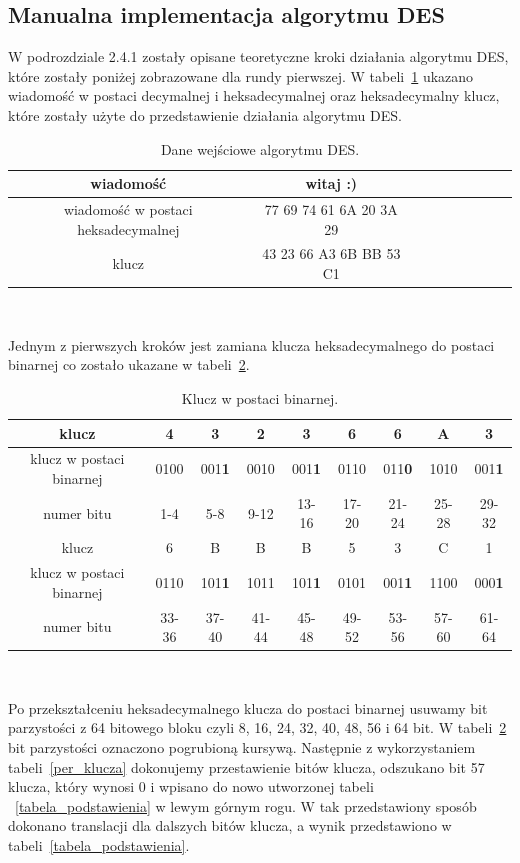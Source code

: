 \documentclass[12p]{article}
\begin{document}
\subsection{Manualna implementacja algorytmu DES}

\quad W podrozdziale 2.4.1 zostały opisane teoretyczne kroki działania algorytmu DES, które zostały poniżej zobrazowane dla rundy pierwszej. W tabeli~\ref{binary} ukazano wiadomość w postaci decymalnej i heksadecymalnej oraz heksadecymalny klucz, które zostały użyte do przedstawienie działania algorytmu DES. 
 
\begin{table}[H]
\centering
\begin{tabular}{|c|c|c|c|c|c|c|c|c|}
\hline
wiadomość & witaj :)\\
\hline
wiadomość w postaci heksadecymalnej & 77 69 74 61 6A 20 3A 29\\
\hline
klucz & 43 23 66 A3 6B BB 53 C1\\
\hline
\end{tabular}
\caption{Dane wejściowe algorytmu DES.}~\label{binary}
\end{table}

Jednym z pierwszych kroków jest zamiana klucza heksadecymalnego do postaci binarnej co zostało ukazane w tabeli~\ref{klucz_to_binary}.


\begin{table}[H]
\centering
\begin{tabular}{|c|c|c|c|c|c|c|c|c|}
\hline
klucz & 4 & 3 & 2 & 3 & 6 & 6 & A & 3\\
\hline
klucz w postaci binarnej & 0100 & 001\textbf{1} & 0010 & 001\textbf{1} & 0110 & 011\textbf{0} & 1010 & 001\textbf{1}\\ 
\hline
numer bitu & 1-4 & 5-8 & 9-12 & 13-16 & 17-20 & 21-24 & 25-28 & 29-32\\
\hline
\hline
klucz & 6 & B & B & B & 5 & 3 & C & 1\\
\hline
klucz w postaci binarnej & 0110 & 101\textbf{1} & 1011 & 101\textbf{1} & 0101 & 001\textbf{1} & 1100 & 000\textbf{1}\\
\hline
numer bitu & 33-36 & 37-40 & 41-44 & 45-48 & 49-52 & 53-56 & 57-60 & 61-64\\
\hline
\end{tabular}
\caption{Klucz w postaci binarnej.}~\label{klucz_to_binary}
\end{table}

Po przekształceniu heksadecymalnego klucza do postaci binarnej usuwamy bit parzystości z 64 bitowego bloku czyli 8, 16, 24, 32, 40, 48, 56 i 64 bit. W tabeli~\ref{klucz_to_binary} bit parzystości oznaczono pogrubioną kursywą. Następnie z wykorzystaniem tabeli~\ref{per_klucza} dokonujemy przestawienie bitów klucza, odszukano bit 57 klucza, który wynosi 0 i wpisano do nowo utworzonej tabeli ~\ref{tabela_podstawienia} w lewym górnym rogu. W tak przedstawiony sposób dokonano translacji dla dalszych bitów klucza, a wynik przedstawiono w tabeli~\ref{tabela_podstawienia}.
\end{document}
